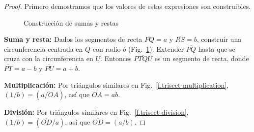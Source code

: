 \begin{proof} Primero demostramos que los valores de estas expresiones son construibles.

\begin{figure}[b]
\begin{center}
\end{center}
\caption{Construcción de sumas y restas}\label{f.trisect-add-subtract}
\end{figure}

\noindent\textbf{Suma y resta:}
Dados los segmentos de recta $\overline{PQ}=a$ y $\overline{RS}=b$, construir una circunferencia centrada en $Q$ con radio $b$ (Fig.~\ref{f.trisect-add-subtract}). Extender $\overline{PQ}$ hasta que se cruza con la circunferencia en $U$. Entonces $\overline{PTQU}$ es un segmento de recta, donde $\overline{PT}=a-b$ y $\overline{PU}=a+b$.

\noindent\textbf{Multiplicación:}
Por triángulos similares en Fig.~\ref{f.trisect-multiplication},
$(1/b)=(a/\overline{OA})$, así que $\overline{OA}=ab$.

\noindent\textbf{División:}
Por triángulos similares en Fig.~\ref{f.trisect-division},
$(1/b)=(\overline{OD}/a)$, así que $\overline{OD}=(a/b)$.


\end{proof}
